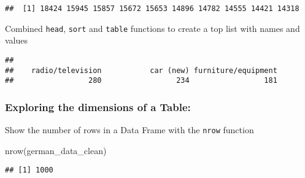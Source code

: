 \documentclass[
]{article}
\newenvironment{Shaded}{\begin{snugshade}}{\end{snugshade}}
\newcommand{\AttributeTok}[1]{\textcolor[rgb]{0.77,0.63,0.00}{#1}}
\newcommand{\ConstantTok}[1]{\textcolor[rgb]{0.00,0.00,0.00}{#1}}
\newcommand{\DecValTok}[1]{\textcolor[rgb]{0.00,0.00,0.81}{#1}}
\newcommand{\FunctionTok}[1]{\textcolor[rgb]{0.00,0.00,0.00}{#1}}
\newcommand{\NormalTok}[1]{#1}
\newcommand{\SpecialCharTok}[1]{\textcolor[rgb]{0.00,0.00,0.00}{#1}}
\begin{document}
\begin{Shaded}
\end{Shaded}

\begin{verbatim}
##  [1] 18424 15945 15857 15672 15653 14896 14782 14555 14421 14318
\end{verbatim}

Combined \texttt{head}, \texttt{sort} and \texttt{table} functions to
create a top list with names and values

\begin{Shaded}
\end{Shaded}

\begin{verbatim}
## 
##    radio/television           car (new) furniture/equipment 
##                 280                 234                 181
\end{verbatim}

\hypertarget{exploring-the-dimensions-of-a-table}{%
\subsubsection{Exploring the dimensions of a
Table:}\label{exploring-the-dimensions-of-a-table}}

Show the number of rows in a Data Frame with the \texttt{nrow} function

\begin{Shaded}
\begin{Highlighting}[]
\FunctionTok{nrow}\NormalTok{(german\_data\_clean)}
\end{Highlighting}
\end{Shaded}

\begin{verbatim}
## [1] 1000
\end{verbatim}
\end{document}
